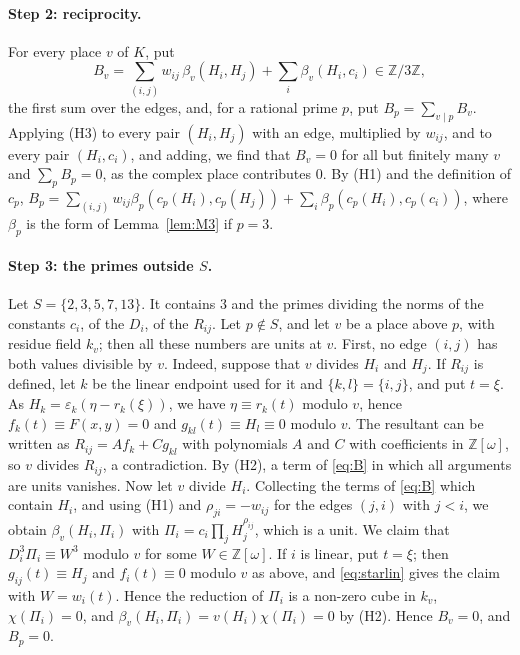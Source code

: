 \documentclass[11pt]{article}
\newcommand{\Z}{\mathbb{Z}}
\begin{document}
\paragraph{Step 2: reciprocity.} For every place $v$ of $K$, put
\begin{equation}\label{eq:B}
B_v=\sum_{(i,j)}w_{ij}\,\beta_v(H_i,H_j)+\sum_i\beta_v(H_i,c_i)\in\Z/3\Z,
\end{equation}
the first sum over the edges, and, for a rational prime $p$, put $B_p=\sum_{v\mid p}B_v$. Applying (H3) to every pair $(H_i,H_j)$ with an edge, multiplied by $w_{ij}$, and to every pair $(H_i,c_i)$, and adding, we find that $B_v=0$ for all but finitely many $v$ and $\sum_pB_p=0$, as the complex place contributes $0$. By (H1) and the definition of $c_p$, $B_p=\sum_{(i,j)}w_{ij}\beta_p(c_p(H_i),c_p(H_j))+\sum_i\beta_p(c_p(H_i),c_p(c_i))$, where $\beta_p$ is the form of Lemma~\ref{lem:M3} if $p=3$.

\paragraph{Step 3: the primes outside $S$.} Let $S=\{2,3,5,7,13\}$. It contains $3$ and the primes dividing the norms of the constants $c_i$, of the $D_i$, of the $R_{ij}$. Let $p\notin S$, and let $v$ be a place above $p$, with residue field $k_v$; then all these numbers are units at $v$. First, no edge $(i,j)$ has both values divisible by $v$. Indeed, suppose that $v$ divides $H_i$ and $H_j$. If $R_{ij}$ is defined, let $k$ be the linear endpoint used for it and $\{k,l\}=\{i,j\}$, and put $t=\xi$. As $H_k=\varepsilon_k(\eta-r_k(\xi))$, we have $\eta\equiv r_k(t)$ modulo $v$, hence $f_k(t)\equiv F(x,y)=0$ and $g_{kl}(t)\equiv H_l\equiv0$ modulo $v$. The resultant can be written as $R_{ij}=Af_k+Cg_{kl}$ with polynomials $A$ and $C$ with coefficients in $\Z[\omega]$, so $v$ divides $R_{ij}$, a contradiction. By (H2), a term of \eqref{eq:B} in which all arguments are units vanishes. Now let $v$ divide $H_i$. Collecting the terms of \eqref{eq:B} which contain $H_i$, and using (H1) and $\rho_{ji}=-w_{ij}$ for the edges $(j,i)$ with $j<i$, we obtain $\beta_v(H_i,\Pi_i)$ with $\Pi_i=c_i\prod_jH_j^{\rho_{ij}}$, which is a unit. We claim that $D_i^3\Pi_i\equiv W^3$ modulo $v$ for some $W\in\Z[\omega]$. If $i$ is linear, put $t=\xi$; then $g_{ij}(t)\equiv H_j$ and $f_i(t)\equiv0$ modulo $v$ as above, and \eqref{eq:starlin} gives the claim with $W=w_i(t)$. Hence the reduction of $\Pi_i$ is a non-zero cube in $k_v$, $\chi(\Pi_i)=0$, and $\beta_v(H_i,\Pi_i)=v(H_i)\chi(\Pi_i)=0$ by (H2). Hence $B_v=0$, and $B_p=0$.
\end{document}
